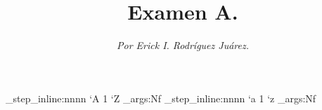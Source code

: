 
\author{\textit{Por Erick I. Rodríguez Juárez.}}
\title{Examen A.}

\usepackage{xltxtra}
\usepackage{amsfonts}
\usepackage{amsmath}
\usepackage{amssymb}
\usepackage{dsfont}
\usepackage{fontspec}
\usepackage[margin=.3in]{geometry}

\setmainfont[
  BoldFont       = bodonibi,
	ItalicFont     = Century modern italic2.ttf,
	BoldItalicFont = bodonibi,
	SmallCapsFont  = lmromancaps10-regular.otf
]{Century_modern.ttf}

\newcommand{\titulo}{
\addfontfeature{LetterSpace=-5}
\pagestyle{empty}
\maketitle 
\thispagestyle{empty}
} 
\newcommand{\dis}{\displaystyle}
\newcommand{\qed}{\hspace{0.5cm}\rule{0.16cm}{0.4cm}}
\newcommand{\operator}[1]{\mathop{\vphantom{\sum}\mathchoice
{\vcenter{\hbox{\huge $#1$}}}
{\vcenter{\hbox{\Large $#1$}}}{#1}{#1}}\displaylimits}
\newcommand{\suma}{\operator{\texttt{[image: IMAGENES/Sigma.png]}}}
\setlength{\parindent}{0mm}

\ExplSyntaxOn
\int_step_inline:nnnn { `A } { 1 } { `Z }
 {  \exp_args:Nf  }
\int_step_inline:nnnn { `a } { 1 } { `z } {  \exp_args:Nf }
\ExplSyntaxOff
